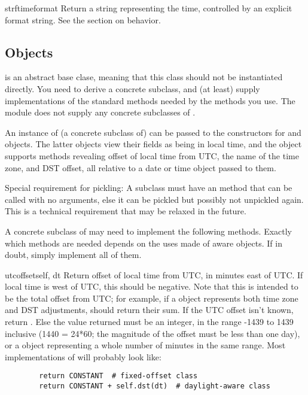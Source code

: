 \begin{methoddesc}{strftime}{format}
    Return a string representing the time, controlled by an explicit
    format string.  See the section on  behavior.
\end{methoddesc}


\subsection{ Objects \label{datetime-tzinfo}}

 is an abstract base clase, meaning that this class
should not be instantiated directly.  You need to derive a concrete
subclass, and (at least) supply implementations of the standard
 methods needed by the  methods you
use.  The  module does not supply any concrete
subclasses of .

An instance of (a concrete subclass of)  can be passed
to the constructors for  and  objects.
The latter objects view their fields as being in local time, and the
 object supports methods revealing offset of local time
from UTC, the name of the time zone, and DST offset, all relative to a
date or time object passed to them.

Special requirement for pickling:  A  subclass must have an
 method that can be called with no arguments, else it
can be pickled but possibly not unpickled again.  This is a technical
requirement that may be relaxed in the future.

A concrete subclass of  may need to implement the
following methods.  Exactly which methods are needed depends on the
uses made of aware  objects.  If in doubt, simply
implement all of them.

\begin{methoddesc}{utcoffset}{self, dt}
    Return offset of local time from UTC, in minutes east of UTC.  If
    local time is west of UTC, this should be negative.  Note that this
    is intended to be the total offset from UTC; for example, if a
     object represents both time zone and DST adjustments,
     should return their sum.  If the UTC offset
    isn't known, return .  Else the value returned must be
    an integer, in the range -1439 to 1439 inclusive (1440 = 24*60;
    the magnitude of the offset must be less than one day), or a
     object representing a whole number of minutes
    in the same range.  Most implementations of 
    will probably look like:
\begin{verbatim}
        return CONSTANT  # fixed-offset class
        return CONSTANT + self.dst(dt)  # daylight-aware class
\end{verbatim}
\end{methoddesc}

